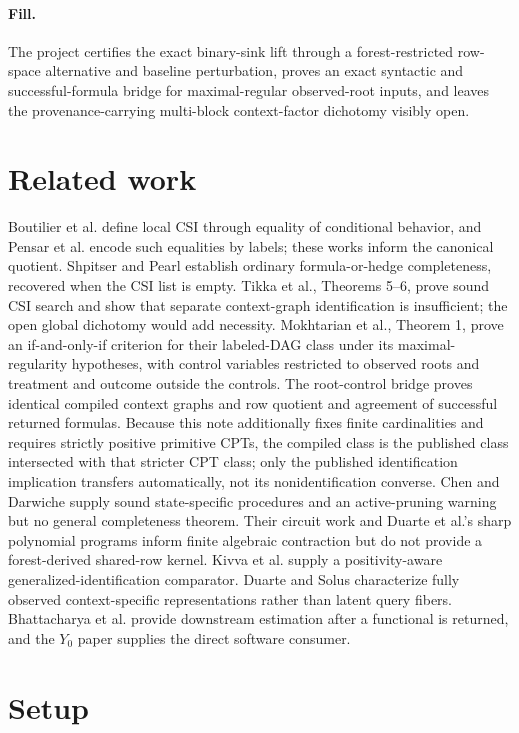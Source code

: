 \documentclass{article}
\begin{document}
\paragraph{Fill.} The project certifies the exact binary-sink lift through a forest-restricted row-space alternative and baseline perturbation, proves an exact syntactic and successful-formula bridge for maximal-regular observed-root inputs, and leaves the provenance-carrying multi-block context-factor dichotomy visibly open.

\section{Related work}

Boutilier et al. define local CSI through equality of conditional behavior, and Pensar et al. encode such equalities by labels; these works inform the canonical quotient. Shpitser and Pearl establish ordinary formula-or-hedge completeness, recovered when the CSI list is empty. Tikka et al., Theorems 5--6, prove sound CSI search and show that separate context-graph identification is insufficient; the open global dichotomy would add necessity. Mokhtarian et al., Theorem 1, prove an if-and-only-if criterion for their labeled-DAG class under its maximal-regularity hypotheses, with control variables restricted to observed roots and treatment and outcome outside the controls. The root-control bridge proves identical compiled context graphs and row quotient and agreement of successful returned formulas. Because this note additionally fixes finite cardinalities and requires strictly positive primitive CPTs, the compiled class is the published class intersected with that stricter CPT class; only the published identification implication transfers automatically, not its nonidentification converse. Chen and Darwiche supply sound state-specific procedures and an active-pruning warning but no general completeness theorem. Their circuit work and Duarte et al.'s sharp polynomial programs inform finite algebraic contraction but do not provide a forest-derived shared-row kernel. Kivva et al. supply a positivity-aware generalized-identification comparator. Duarte and Solus characterize fully observed context-specific representations rather than latent query fibers. Bhattacharya et al. provide downstream estimation after a functional is returned, and the \(Y_0\) paper supplies the direct software consumer.

\section{Setup}
\end{document}
